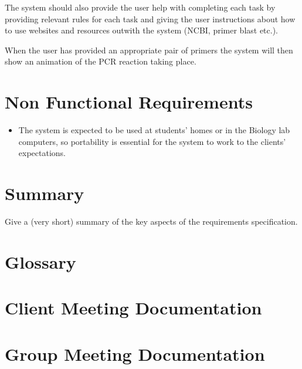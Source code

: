 \documentclass{l3deliverable}
\begin{document}
The system should also provide the user help with completing each task
by providing relevant rules for each task and giving the user
instructions about how to use websites and resources outwith the system
(NCBI, primer blast etc.).

When the user has provided an appropriate pair of primers the system
will then show an animation of the PCR reaction taking place.



\section{Non Functional Requirements}


\begin{itemize}
\item{
The system is expected to be used at students' homes or in the Biology
lab computers, so portability is essential for the system to work to
the clients' expectations.
}
\end{itemize}

\section{Summary}

Give a (very short) summary of the key aspects of the requirements
specification.


\appendix

\section{Glossary}



\section{Client Meeting Documentation}
\label{sec:clientMeetingDocs}


\section{Group Meeting Documentation}

\end{document}
